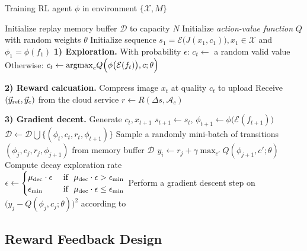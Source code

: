 \begin{algorithm}[!t]
	\caption{Training RL agent $ \phi $ in environment $ \{\mathcal{X}, M\} $}
	\label{alg: rl-train}
	\begin{algorithmic}[1]
		\STATE Initialize replay memory buffer $ \mathcal{D} $ to capacity $ N $
		\STATE Initialize \emph{action-value function} $ Q $ with random weights $ \theta $
		\STATE Initialize sequence $ s_1 = \mathcal{E}\big(J(x_1, c_1)\big), x_1 \in \mathcal{X} $ and $ \phi_1 = \phi(f_1) $
		\STATE \textbf{1) Exploration.} With probability $\epsilon$:
		\STATE \hspace{1em} $c_t \leftarrow$ a random valid value 
		\STATE Otherwise:
		\STATE \hspace{1em} $ c_t \leftarrow {\rm argmax}_cQ\Big(\phi\big(\mathcal{E}(f_t)\big), c; \theta\Big) $

		\STATE
		
		\STATE \textbf{2) Reward calcuation.} 
		\STATE Compress image $ x_t $ at quality $ c_t $ to upload
		\STATE Receive $ (\vec{y}_{\rm ref}, \vec{y}_c) $ from the cloud service
		\STATE $ r \leftarrow R(\Delta s, \mathcal{A}_c) $
		
		\STATE 
		\STATE \textbf{3) Gradient decent.} Generate $ c_t, x_{t+1} $
		\STATE $ s_{t+1} \leftarrow s_t $, $ \phi_{t+1} \leftarrow \phi \big(\mathcal{E}(f_{t+1})\big) $
		\STATE $ \mathcal{D} \leftarrow \mathcal{D} \bigcup \{(\phi_t, c_t, r_t, \phi_{t+1}) \} $
		\STATE Sample a randomly mini-batch of transitions \\ $ (\phi_j, c_j, r_j, \phi_{j+1}) $ from memory buffer $ \mathcal{D} $
		\STATE $ y_i \leftarrow r_j + \gamma \max_{c'}Q(\phi_{j+1}, c'; \theta) $
		\STATE Compute decay exploration rate \\
		$ \epsilon \leftarrow 
		\begin{cases}
		\mu_{\rm dec}\cdot \epsilon & \text{ if } \ \mu_{\rm dec}\cdot \epsilon > \epsilon_{\min} \\ 
		\epsilon_{\min}             & \text{ if } \ \mu_{\rm dec}\cdot \epsilon \leq \epsilon_{\min}
		\end{cases} $
		\STATE Perform a gradient descent step on \\ $ \big(y_j - Q(\phi_j, c_j; \theta)\big)^2 $ according to~\cite{DQN}
		\ENDIF
		\ENDFOR
	\end{algorithmic}
\end{algorithm}

\subsection{Reward Feedback Design}

